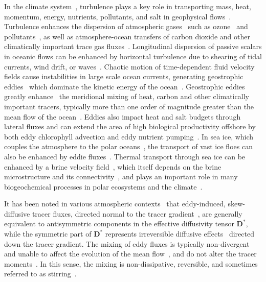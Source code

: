 \documentclass[leqno,onefignum,onetabnum]{siamltex1213}
\newcommand{\Db}{\mathbf{D}}
\begin{document}
In the climate
system~\cite{Csanady:1973:9789027702609,Griffies:2003:10.1007},
turbulence plays a key role in transporting mass, heat, momentum,
energy, nutrients, pollutants, and salt in geophysical
flows~\cite{Moffatt:RPP:621}. Turbulence enhances the dispersion of
atmospheric gases~\cite{Espinosa:MET1292} such as
ozone~\cite{Holton:JGRC2495,Pitari:JGR:1986,Plumb:JAS:1979,Plumb:JAS:1987}
and
pollutants~\cite{Bilger:10.1175,Beychok:1994:9780964458802,Samson:1988:88009978},
as well as atmosphere-ocean transfers of carbon dioxide and other
climatically important trace gas
fluxes~\cite{Zappa:2007:67613,Banerjee:10.1007}.  Longitudinal
dispersion of passive scalars in oceanic flows can be enhanced by
horizontal turbulence due to shearing of tidal currents, wind drift,
or
waves~\cite{Young:JPO:1982:515,Kullenberg:1972:TUS1529,Bowden:JFM:1965}.   
Chaotic motion of 
time-dependent fluid velocity fields cause instabilities in large
scale ocean currents, generating geostrophic
eddies~\cite{Ferrari:JPO:1501} which dominate the kinetic energy of
the ocean~\cite{Ferrari:ARFM:253}. Geostrophic
eddies greatly enhance~\cite{Ferrari:JPO:1501} the meridional mixing
of heat, carbon and other climatically important tracers, typically
more than one order of magnitude greater than the mean flow of the
ocean~\cite{Souza:OS:317}. Eddies also impact heat and salt budgets
through lateral fluxes and can extend the area of high biological
productivity offshore by both eddy chlorophyll advection and eddy
nutrient pumping~\cite{Chaigneau:JGR:C11025}. In sea ice, which 
couples the atmosphere to the polar
oceans~\cite{Washington:1986:9780935702521}, the transport of vast ice
floes can also be enhanced by eddie
fluxes~\cite{Watanabe:2009JPO4010}. Thermal transport through sea ice
can be enhanced by a brine velocity
field~\cite{Lytle:JGR-8853,Trodahl:2001:TCS}, which itself depends on
the brine microstructure and its
connectivity~\cite{Golden:S-2238,Golden:GRL:L16501}, and plays an
important role in many biogeochemical processes in polar ecosystems
and the climate~\cite{Golden:NAMS:2009}.




It has been noted in various atmospheric
contexts~\cite{Plumb:JAS:1979,Plumb:JAS:1987} that eddy-induced,
skew-diffusive tracer fluxes, directed normal to the tracer
gradient~\cite{Middleton:JPO:5840223}, are generally equivalent to
antisymmetric components in the effective 
diffusivity tensor $\Db^*$, while the symmetric part of $\Db^*$
represents irreversible diffusive
effects~\cite{Redi:JPO:1982:1154,Solomon:OGR:1971:233,Griffies:JPO:1998}
directed down the tracer gradient. The mixing of eddy fluxes is
typically non-divergent and unable to affect the evolution of the mean
flow~\cite{Middleton:JPO:5840223}, and do not alter the tracer
moments~\cite{Griffies:JPO:1998}. In this sense, the 
mixing is non-dissipative, reversible, and sometimes referred to as
stirring~\cite{Eckart:JMR:1948,Griffies:JPO:1998}.  
\end{document}
